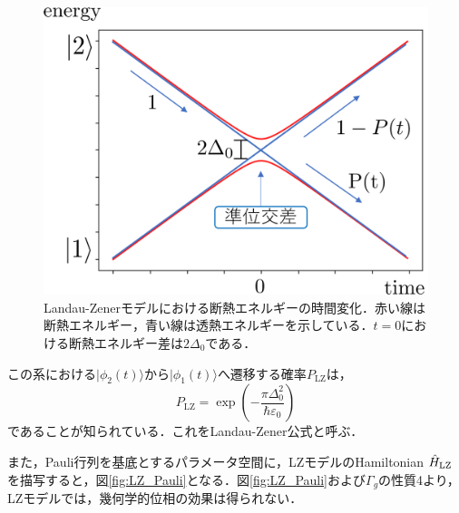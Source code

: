 \documentclass[a4paper, titlepage]{jsreport}
\begin{document}
\begin{figure}[htbp]
  \centering
  \includegraphics[scale=0.5]{figures/LZ.png}   
  \caption{Landau-Zenerモデルにおける断熱エネルギーの時間変化．赤い線は断熱エネルギー，青い線は透熱エネルギーを示している．$t=0$における断熱エネルギー差は$2\Delta_0$である．}
  \label{fig:LZ}
\end{figure}


この系における$|\phi_2(t)\rangle$から$|\phi_1(t)\rangle$へ遷移する確率$P_{\mathrm{LZ}}$は，
\begin{equation}
P_{\mathrm{LZ}}=\exp \left(-\frac{\pi \Delta_0^2}{\hbar \varepsilon_0 } \right) 
\end{equation}
であることが知られている．これをLandau-Zener公式と呼ぶ．


また，Pauli行列を基底とするパラメータ空間に，LZモデルのHamiltonian $\Hat{H}_{\mathrm{LZ}}$を描写すると，図\ref{fig:LZ_Pauli}となる．図\ref{fig:LZ_Pauli}および$\Gamma_g$の性質4より，LZモデルでは，幾何学的位相の効果は得られない．
\end{document}
